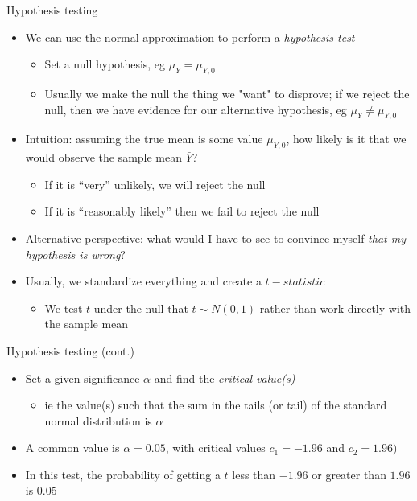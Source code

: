 \documentclass[aspectratio=169]{beamer}
\begin{document}
\begin{frame}{Hypothesis testing}
    \begin{itemize}
        \item We can use the normal approximation to perform a \textit{hypothesis test}
        \begin{itemize}
            \item Set a null hypothesis, eg $\mu_Y = \mu_{Y,0}$
            \item Usually we make the null the thing we "want" to disprove; if we reject the null, then we have evidence for our alternative hypothesis, eg $\mu_Y \neq \mu_{Y,0}$
        \end{itemize}
        \item Intuition: assuming the true mean is some value $\mu_{Y,0}$, how likely is it that we would observe the sample mean $\bar{Y}$?
        \begin{itemize}
            \item If it is ``very'' unlikely, we will reject the null
            \item If it is ``reasonably likely'' then we fail to reject the null
        \end{itemize}
        \item Alternative perspective: what would I have to see to convince myself \textit{that my hypothesis is wrong}?
        \item Usually, we standardize everything and create a $t-statistic$
        \begin{itemize}
            \item We test $t$ under the null that $t \sim N(0,1)$ rather than work directly with the sample mean
        \end{itemize}
    \end{itemize}
\end{frame}

\begin{frame}{Hypothesis testing (cont.)}
    \begin{itemize}
        \item Set a given significance $\alpha$ and find the \textit{critical value(s)}
        \begin{itemize}
            \item ie the value(s) such that the sum in the tails (or tail) of the standard normal distribution is $\alpha$
        \end{itemize}
        \item A common value is $\alpha=0.05$, with critical values $c_1=-1.96$ and $c_2 = 1.96)$
        \item In this test, the probability of getting a $t$ less than $-1.96$ or greater than $1.96$ is 0.05
    \end{itemize}
\end{frame}
\end{document}

